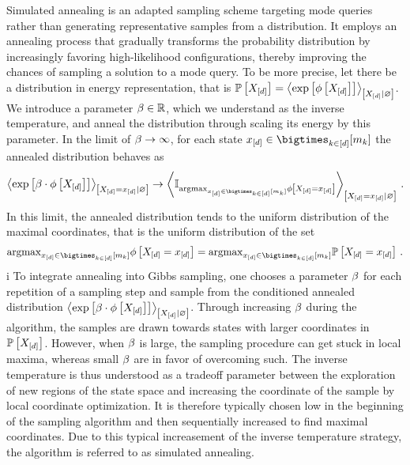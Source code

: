 Simulated annealing is an adapted sampling scheme targeting mode queries rather than generating representative samples from a distribution.
It employs an annealing process that gradually transforms the probability distribution by increasingly favoring high-likelihood configurations, thereby improving the chances of sampling a solution to a mode query.
To be more precise, let there be a distribution in energy representation, that is $\mathbb{P}\left[X_{[d]}\right]=\left\langle \mathrm{exp}\left[\phi\left[X_{[d]}\right]\right]\right\rangle_{\left[ X_{[d]} | \varnothing \right]}$.
We introduce a parameter $\beta\in\mathbb{R}$, which we understand as the inverse temperature, and anneal the distribution through scaling its energy by this parameter.
In the limit of $\beta\rightarrow\infty$, for each state $\shortcatindicesin$ the annealed distribution behaves as
\begin{align*}
    \normalizationof{\expof{\invtemp\cdot\energytensorwith}}{\indexedshortcatvariables} \rightarrow
    \normalizationof{\ones_{\argmax_{\shortcatindicesin}\energytensorat{\indexedshortcatvariables}}}{\indexedshortcatvariables} \, .
\end{align*}
In this limit, the annealed distribution tends to the uniform distribution of the maximal coordinates, that is the uniform distribution of the set
\begin{align*}
    \argmax_{\shortcatindicesin}\energytensorat{\indexedshortcatvariables} = \argmax_{\shortcatindicesin}\probat{\indexedshortcatvariables} \, .
\end{align*}
i
To integrate annealing into Gibbs sampling, one chooses a parameter $\beta$ for each repetition of a sampling step and sample from the conditioned annealed distribution $\left\langle \mathrm{exp}\left[\beta\cdot\phi\left[X_{[d]}\right]\right]\right\rangle_{\left[ X_{[d]} | \varnothing \right]}$.
Through increasing $\beta$ during the algorithm, the samples are drawn towards states with larger coordinates in $\mathbb{P}\left[X_{[d]}\right]$.
However, when $\beta$ is large, the sampling procedure can get stuck in local maxima, whereas small $\beta$ are in favor of overcoming such.
The inverse temperature is thus understood as a tradeoff parameter between the exploration of new regions of the state space and increasing the coordinate of the sample by local coordinate optimization.
It is therefore typically chosen low in the beginning of the sampling algorithm and then sequentially increased to find maximal coordinates.
Due to this typical increasement of the inverse temperature strategy, the algorithm is referred to as simulated annealing.
